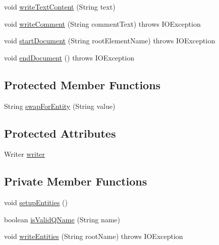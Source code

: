 \begin{DoxyCompactItemize}
\item 
void \hyperlink{classorg_1_1coode_1_1xml_1_1_x_m_l_writer_impl_a547f47a25865a9f5727030344567b2f5}{write\-Text\-Content} (String text)
\item 
void \hyperlink{classorg_1_1coode_1_1xml_1_1_x_m_l_writer_impl_a1142fa8707d8ec71ad8361e7d268354f}{write\-Comment} (String comment\-Text)  throws I\-O\-Exception 
\item 
void \hyperlink{classorg_1_1coode_1_1xml_1_1_x_m_l_writer_impl_a0524112e03e159de3f8041cec23ed2d0}{start\-Document} (String root\-Element\-Name)  throws I\-O\-Exception 
\item 
void \hyperlink{classorg_1_1coode_1_1xml_1_1_x_m_l_writer_impl_aa88bebcc43e55f44d509dc7c038204c2}{end\-Document} ()  throws I\-O\-Exception 
\end{DoxyCompactItemize}
\subsection*{Protected Member Functions}
\begin{DoxyCompactItemize}
\item 
String \hyperlink{classorg_1_1coode_1_1xml_1_1_x_m_l_writer_impl_a1174559b35a4932462ec23b5f1a9fb09}{swap\-For\-Entity} (String value)
\end{DoxyCompactItemize}
\subsection*{Protected Attributes}
\begin{DoxyCompactItemize}
\item 
Writer \hyperlink{classorg_1_1coode_1_1xml_1_1_x_m_l_writer_impl_a87d95a702c851f1b17169c04ffe5053d}{writer}
\end{DoxyCompactItemize}
\subsection*{Private Member Functions}
\begin{DoxyCompactItemize}
\item 
void \hyperlink{classorg_1_1coode_1_1xml_1_1_x_m_l_writer_impl_a7034fa83d81786a31fca270e7ec66522}{setup\-Entities} ()
\item 
boolean \hyperlink{classorg_1_1coode_1_1xml_1_1_x_m_l_writer_impl_a3ad6244601a6189193c46c4cfe2401e4}{is\-Valid\-Q\-Name} (String name)
\item 
void \hyperlink{classorg_1_1coode_1_1xml_1_1_x_m_l_writer_impl_a4e9dc5407d73321da07382181f99c28a}{write\-Entities} (String root\-Name)  throws I\-O\-Exception 
\end{DoxyCompactItemize}
